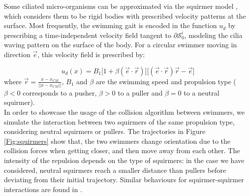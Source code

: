 \documentclass[graybox]{svmult}
\newcommand{\Solid}{\mathcal{S}} %
\begin{document}
Some ciliated micro-organisms can be approximated via the squirmer model \cite{blake1971spherical,lighthill1952squirming}, which considers them to be rigid bodies with prescribed velocity patterns at the surface. Most frequently, the swimming gait is encoded in the function $u_d$ by prescribing a time-independent velocity field tangent to $\partial \Solid_0^i$, modeling the cilia waving pattern on the surface of the body. For a circular swimmer moving in direction $\overrightarrow{e}$, this velocity field is prescribed by:

$$
u_d(x) =  B_1 \Bigg[ 1 + \beta (\overrightarrow{e} \cdot \overrightarrow{r}) \Bigg] \Bigg[(\overrightarrow{e} \cdot \overrightarrow{r})\overrightarrow{r} - \overrightarrow{e} \Bigg]
$$ 
where  $ \overrightarrow{r} = \frac{x - x_{CM}} {||x - x_{CM}||} $, $B_1$ and $\beta$ are the swimming speed and propulsion type ( $\beta < 0$ corresponds to a pusher, $\beta > 0$ to a puller and $\beta = 0$ to a neutral squirmer).\\
In order to showcase the usage of the collision algorithm between swimmers, we simulate the interaction between two squirmers of the same propulsion type, considering neutral squirmers or pullers. The trajectories in Figure \ref{Fig:squirmers} show that, the two swimmers change orientation due to the collision forces when getting closer, and then move away from each other.
The intensity of the repulsion depends on the type of squirmers: in the case we have considered, neutral squirmers reach a smaller distance than pullers before deviating from their initial trajectory. Similar behaviours for squirmer-squirmer interactions are found in \cite{ishikawa2006hydrodynamic}. 
\end{document}
